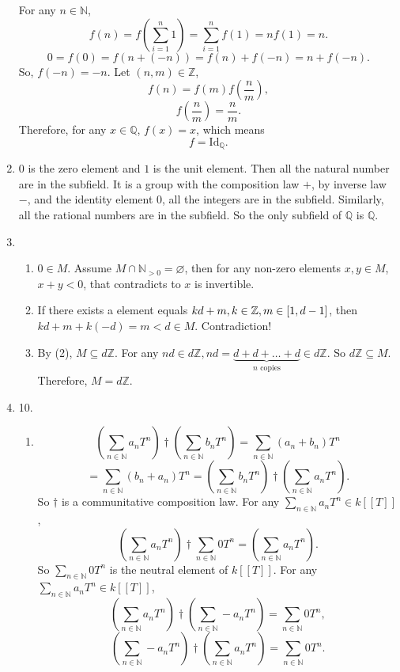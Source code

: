 \documentclass[12pt]{article}
\newcommand{\NN}{\mathbb{N}}
\newcommand{\ZZ}{\mathbb{Z}}
\newcommand{\QQ}{\mathbb{Q}}
\begin{document}
\begin{enumerate}
        For any $n\in\NN$, 
        $$f(n)=f\left(\sum_{i=1}^{n}1\right)=\sum_{i=1}^{n}f(1)=nf(1)=n.$$
        $$0=f(0)=f(n+(-n))=f(n)+f(-n)=n+f(-n).$$
        So, $f(-n)=-n$. Let $(n,m)\in \ZZ$,
        $$f(n)=f(m)f(\frac{n}{m}),$$
        $$f(\frac{n}{m})=\frac{n}{m}.$$
        Therefore, for any $x\in \QQ$, $f(x)=x$, which means 
        $$f=\mathrm{Id}_{\QQ}.$$
    \item  $0$ is the zero element and $1$ is the unit element. Then all the natural number are in the subfield. It is a group with the composition law $+$, by inverse law $-$, and the identity element $0$, all the integers are in the subfield. Similarly, all the rational numbers are in the subfield. So the only subfield of $\QQ$ is $\QQ$.
    \item 
        \begin{enumerate}
            \item $0\in M$. Assume $M\cap\NN_{>0}=\varnothing$, then for any non-zero elements $x,y\in M$, $x+y<0$, that contradicts to $x$ is invertible.
            \item If there exists a element equals $kd+m,k\in \ZZ,m\in\interval{1}{d-1} $, then $kd+m+k(-d)=m<d\in M$. Contradiction!
            \item By (2), $M\subseteq d\ZZ$. For any $nd\in d\ZZ, nd=\underset{n \text{ copies}}{\underbrace{d+d+\dots+d}}\in d\ZZ$. So $d\ZZ\subseteq M$. Therefore, $M=d\ZZ$.
        \end{enumerate}
    \item 10.
        \begin{enumerate}
            \item $$\left(\sum_{n\in \NN}a_nT^n\right)\dagger \left(\sum_{n\in \NN}b_nT^n\right)=\sum_{n\in \NN}(a_n+b_n)T^n$$
            $$=\sum_{n\in \NN}(b_n+a_n)T^n=\left(\sum_{n\in \NN}b_nT^n\right)\dagger\left(\sum_{n\in \NN}a_nT^n\right).$$
            So $\dagger$ is a communitative composition law.
            \newline
            For any $\sum_{n\in \NN}a_nT^n\in k[[T]]$,
            $$\left(\sum_{n\in \NN}a_nT^n\right)\dagger\sum_{n\in \NN}0T^n=\left(\sum_{n\in \NN}a_nT^n\right).$$
            So $\sum_{n\in\NN}0T^n$ is the neutral element of $k[[T]]$.
            \newline
            For any $\sum_{n\in \NN}a_nT^n\in k[[T]]$,
            $$\left(\sum_{n\in \NN}a_nT^n\right)\dagger\left(\sum_{n\in \NN}-a_nT^n\right)=\sum_{n\in \NN}0T^n,$$
            $$\left(\sum_{n\in \NN}-a_nT^n\right)\dagger\left(\sum_{n\in \NN}a_nT^n\right)=\sum_{n\in \NN}0T^n.$$

\end{enumerate}
\end{enumerate}
\end{document}

